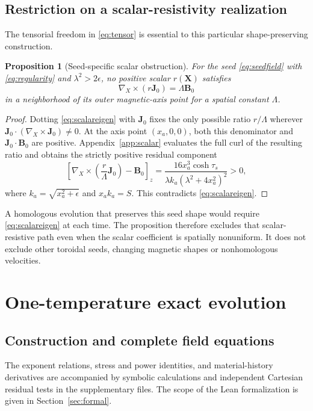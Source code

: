 \documentclass[11pt,a4paper]{article}
\newtheorem{proposition}{Proposition}
\theoremstyle{remark}\newtheorem{remark}{Remark}
\numberwithin{equation}{section}
\newcommand{\BB}{\boldsymbol B}
\newcommand{\JJ}{\boldsymbol J}
\newcommand{\XX}{\boldsymbol X}
\newcommand{\grad}{\nabla}
\begin{document}
\subsection{Restriction on a scalar-resistivity realization}
The tensorial freedom in \eqref{eq:tensor} is essential to this particular shape-preserving construction.
\begin{proposition}[Seed-specific scalar obstruction]\label{prop:scalar}
For the seed \eqref{eq:seedfield} with \eqref{eq:regularity} and $\lambda^2>2\epsilon$, no positive scalar $r(\XX)$ satisfies
\begin{equation}
\grad_X\!\times(r\JJ_0)=\Lambda\BB_0
\label{eq:scalareigen}
\end{equation}
in a neighborhood of its outer magnetic-axis point for a spatial constant $\Lambda$.
\end{proposition}
\begin{proof}
Dotting \eqref{eq:scalareigen} with $\JJ_0$ fixes the only possible ratio $r/\Lambda$ wherever $\JJ_0\cdot(\grad_X\!\times\JJ_0)\ne0$. At the axis point $(x_a,0,0)$, both this denominator and $\JJ_0\cdot\BB_0$ are positive. Appendix~\ref{app:scalar} evaluates the full curl of the resulting ratio and obtains the strictly positive residual component
\begin{equation}
\left[\grad_X\!\times\left(\frac r\Lambda\JJ_0\right)-\BB_0\right]_z
=\frac{16x_a^3\cosh\tau_s}
{\lambda k_a(\lambda^2+4x_a^2)^2}>0,
\label{eq:scalarresidual}
\end{equation}
where $k_a=\sqrt{x_a^2+\epsilon}$ and $x_ak_a=S$. This contradicts \eqref{eq:scalareigen}.
\end{proof}
A homologous evolution that preserves this seed shape would require \eqref{eq:scalareigen} at each time. The proposition therefore excludes that scalar-resistive path even when the scalar coefficient is spatially nonuniform. It does not exclude other toroidal seeds, changing magnetic shapes or nonhomologous velocities.


\section{One-temperature exact evolution}\label{sec:oneT}
\subsection{Construction and complete field equations}
The exponent relations, stress and power identities, and material-history derivatives are accompanied by symbolic calculations and independent Cartesian residual tests in the supplementary files. The scope of the Lean formalization is given in Section~\ref{sec:formal}.
\end{document}
